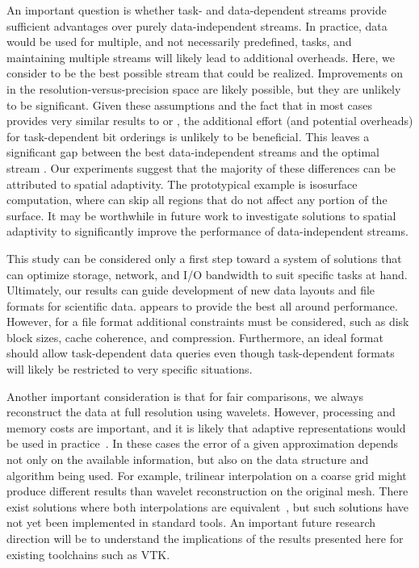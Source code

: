 An important question is whether task- and data-dependent streams provide sufficient advantages over
purely data-independent streams. In practice, data would be used for multiple, and not necessarily
predefined, tasks, and maintaining multiple streams will likely lead to additional overheads. Here,
we consider \ssig to be the best possible stream that could be realized. Improvements on \ssig in
the resolution-versus-precision space are likely possible, but they are unlikely to be significant.
Given these assumptions and the fact that \ssig in most cases provides very similar results to \sbit
or \swav, the additional effort (and potential overheads) for task-dependent bit orderings is
unlikely to be beneficial. This leaves a significant gap between the best data-independent streams
and the optimal stream \sopt. Our experiments suggest that the majority of these differences can be
attributed to spatial adaptivity. The prototypical example is isosurface computation, where \sopt
can skip all regions that do not affect any portion of the surface. It may be worthwhile in future
work to investigate solutions to spatial adaptivity to significantly improve the performance of
data-independent streams.

This study can be considered only a first step toward a system of solutions that can optimize
storage, network, and I/O bandwidth to suit specific tasks at hand. Ultimately, our results can
guide development of new data layouts and file formats for scientific data. \swav appears to provide
the best all around performance. However, for a file format additional constraints must be
considered, such as disk block sizes, cache coherence, and compression. Furthermore, an ideal format
should allow task-dependent data queries even though task-dependent formats will likely be
restricted to very specific situations. 

Another important consideration is that for fair comparisons, we always reconstruct the data at full
resolution using wavelets. However, processing and memory costs are important, and it is likely that
adaptive representations would be used in practice~\cite{gigavoxels,Gobbetti2008,vdb2013}. In these
cases the error of a given approximation depends not only on the available information, but also on
the data structure and algorithm being used. For example, trilinear interpolation on a coarse grid
might produce different results than wavelet reconstruction on the original mesh. There exist
solutions where both interpolations are equivalent~\cite{weiss}, but such solutions have not yet
been implemented in standard tools. An important future research direction will be to understand the
implications of the results presented here for existing toolchains such as VTK.

